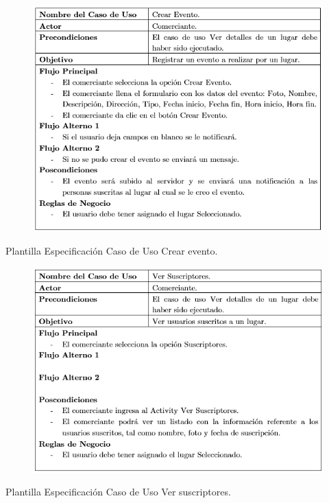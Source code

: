 \documentclass[12pt,letterpaper,openany]{book}
\begin{document}
\begin{table}[H]
\begin{center}
\begin{figure}[H]
\begin{center}
\includegraphics[width=13cm]{./imagenes/PCU/crear_evento}
\end{center}
\end{figure}
\end{center}
\caption{Plantilla Especificación Caso de Uso Crear evento.}
\end{table}

\begin{table}[H]
\begin{center}
\begin{figure}[H]
\begin{center}
\includegraphics[width=13cm]{./imagenes/PCU/ver_suscriptores}
\end{center}
\end{figure}
\end{center}
\caption{Plantilla Especificación Caso de Uso Ver suscriptores.}
\end{table}
\end{document}
